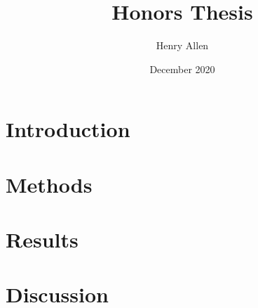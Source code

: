 \documentclass{article}
\title{Honors Thesis}
\author{Henry Allen }
\date{December 2020}
\begin{document}
\maketitle

\begin{abstract}

\end{abstract}

\section{Introduction}


\section{Methods}


\section{Results}


\section{Discussion}



\end{document}
